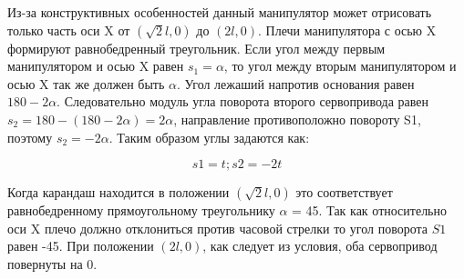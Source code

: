 \solutionSection
Из-за конструктивных особенностей данный манипулятор может отрисовать только часть оси X от $(\sqrt{2}l, 0)$ до $(2l, 0)$. Плечи манипулятора с осью X формируют равнобедренный треугольник. Если угол между первым манипулятором и осью X равен $s_1=\alpha$, то угол между вторым манипулятором и осью X так же должен быть $\alpha$. Угол лежаший напротив основания равен $180 - 2\alpha$. Следовательно модуль угла поворота второго сервопривода равен $s_2 = 180 - (180 - 2\alpha) = 2\alpha$, направление противоположно повороту S1, поэтому $s_2 = -2\alpha$. Таким образом углы задаются как:

\[ s1 = t; s2 = -2t\]

Когда карандаш находится в положении $(\sqrt{2}l, 0)$ это соответствует равнобедренному прямоугольному треугольнику $\alpha$ = 45\textdegree. Так как относительно оси X плечо должно отклониться против часовой стрелки то угол поворота $S1$ равен -45\textdegree. При положении $(2l, 0)$, как следует из условия, оба сервопривод повернуты на 0\textdegree. 

